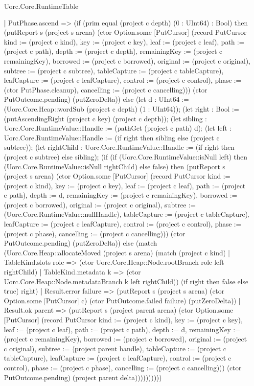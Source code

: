 \begin{lexlean}{Uorc.Core.RuntimeTable}
\begin{semanticmodule}
{      | PutPhase.ascend => (if (prim equal (project c depth) (0 : UInt64) : Bool) then (putReport s (project s arena) (ctor Option.some [PutCursor] (record PutCursor {kind := (project c kind), key := (project c key), leaf := (project c leaf), path := (project c path), depth := (project c depth), remainingKey := (project c remainingKey), borrowed := (project c borrowed), original := (project c original), subtree := (project c subtree), tableCapture := (project c tableCapture), leafCapture := (project c leafCapture), control := (project c control), phase := (ctor PutPhase.cleanup), cancelling := (project c cancelling)})) (ctor PutOutcome.pending) (putZeroDelta)) else (let d : UInt64 := (Uorc.Core.Heap::wordSub (project c depth) (1 : UInt64)); (let right : Bool := (putAscendingRight (project c key) (project c depth)); (let sibling : Uorc.Core.RuntimeValue::Handle := (pathGet (project c path) d); (let left : Uorc.Core.RuntimeValue::Handle := (if right then sibling else (project c subtree)); (let rightChild : Uorc.Core.RuntimeValue::Handle := (if right then (project c subtree) else sibling); (if (if (Uorc.Core.RuntimeValue::isNull left) then (Uorc.Core.RuntimeValue::isNull rightChild) else false) then (putReport s (project s arena) (ctor Option.some [PutCursor] (record PutCursor {kind := (project c kind), key := (project c key), leaf := (project c leaf), path := (project c path), depth := d, remainingKey := (project c remainingKey), borrowed := (project c borrowed), original := (project c original), subtree := (Uorc.Core.RuntimeValue::nullHandle), tableCapture := (project c tableCapture), leafCapture := (project c leafCapture), control := (project c control), phase := (project c phase), cancelling := (project c cancelling)})) (ctor PutOutcome.pending) (putZeroDelta)) else (match (Uorc.Core.Heap::allocateMoved (project s arena) (match (project c kind)
          | TableKind.slots role => (ctor Uorc.Core.Heap::Node.rootBranch role left rightChild)
          | TableKind.metadata k => (ctor Uorc.Core.Heap::Node.metadataBranch k left rightChild)) (if right then false else true) right)
        | Result.error failure => (putReport s (project s arena) (ctor Option.some [PutCursor] c) (ctor PutOutcome.failed failure) (putZeroDelta))
        | Result.ok parent => (putReport s (project parent arena) (ctor Option.some [PutCursor] (record PutCursor {kind := (project c kind), key := (project c key), leaf := (project c leaf), path := (project c path), depth := d, remainingKey := (project c remainingKey), borrowed := (project c borrowed), original := (project c original), subtree := (project parent handle), tableCapture := (project c tableCapture), leafCapture := (project c leafCapture), control := (project c control), phase := (project c phase), cancelling := (project c cancelling)})) (ctor PutOutcome.pending) (project parent delta))))))))))
}
\end{semanticmodule}
\end{lexlean}

